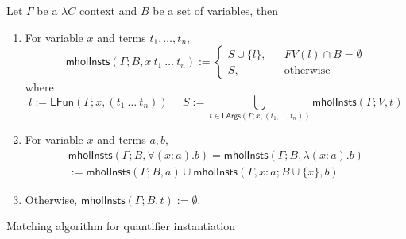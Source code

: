 \begin{definition}
  Let $\Gamma$ be a $\lambda C$ context and $B$ be a set of variables, then
  \begin{enumerate}
    \item For variable $x$ and terms $t_1, \dots, t_n$,
      $$\mathsf{mholInsts}(\Gamma; B, x \ t_1 \ \dots \ t_n) := \left\{
        \begin{aligned}
          S \cup \{l\}, & & FV(l) \cap B = \emptyset \\
          S, & & \text{otherwise}
        \end{aligned}
      \right.$$
      where
      $$l := \mathsf{LFun}(\Gamma; x, (t_1 \ \dots \ t_n)) \ \ \ \ \ \ S := \bigcup_{t \in \mathsf{LArgs}(\Gamma; x, (t_1, \dots, t_n))} \mathsf{mholInsts}(\Gamma; V, t)$$
    \item For variable $x$ and terms $a, b$,
      \begin{align*}
        \mathsf{mholInsts}(\Gamma; B, \forall (x : a). b) = \mathsf{mholInsts}(\Gamma; B, \lambda (x : a). b) 
        \\ := \mathsf{mholInsts}(\Gamma; B, a) \cup \mathsf{mholInsts}(\Gamma, x : a; B \cup \{x\}, b)
      \end{align*}
    \item Otherwise, $\mathsf{mholInsts}(\Gamma; B, t) := \emptyset$.
  \end{enumerate}
\end{definition}

\begin{algorithm}\label{matching}
  \DontPrintSemicolon
  \SetNoFillComment
  \caption{Matching algorithm for quantifier instantiation}
\end{algorithm}

